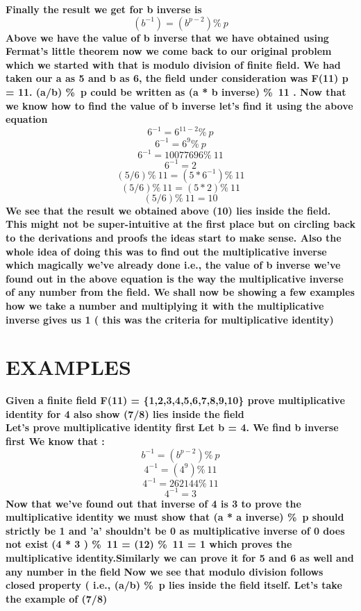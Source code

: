\documentclass{article}
\begin{document}
\textbf {Finally the result we get for b inverse is }
\textbf {\[ (b^{-1}) = (b ^{p-2})\%\ p \] }
\textbf {Above we have the value of b inverse that we have obtained using Fermat's little theorem now we come back to our original problem which we started with that is modulo division of finite field. We had taken our a as 5 and b as 6, the field under consideration was F(11) p = 11. (a/b) \%\ p could be written as (a * b inverse) \%\ 11 . Now that we know how to find the value of b inverse let's find it using the above equation}
\textbf {\[ 6 ^{-1}  = 6 ^{11 -2} \%\ p \]}
\textbf{\[6 ^{-1} = 6 ^{9} \%\ p \]}
\textbf {\[6 ^{-1} = 10077696 \%\ 11 \]}
\textbf {\[6 ^{-1} = 2\]} 
\textbf {\[ (5/6) \%\ 11 = (5 * 6 ^{-1} ) \%\ 11 \]}
\textbf {\[ (5/6) \%\ 11 = (5 * 2 ) \%\ 11 \]}
\textbf {\[ (5/6) \%\ 11 = 10 \]}
\textbf { We see that the result we obtained above (10) lies inside the field. This might not be super-intuitive at the first place but on circling back to the derivations and proofs the ideas start to make sense. Also the whole idea of doing this was to find out the multiplicative inverse which magically we've already done i.e., the value of b inverse we've found out in the above equation is the way the multiplicative inverse of any number from the field. We shall now be showing a few examples how we take  a number and multiplying it with the multiplicative inverse gives us 1 ( this was the criteria for multiplicative identity) }

\pagebreak 
\section * {EXAMPLES}
\textbf {Given a finite field F(11) = \{1,2,3,4,5,6,7,8,9,10\} prove multiplicative identity for 4 also show  (7/8) lies inside the field}
\\
\textbf {Let's prove multiplicative identity first}
\textbf {Let b = 4. We find b inverse first We know that :}
\textbf{\[b ^{-1} = (b ^{p-2})\%\ p \]}
\textbf{\[4 ^{-1} = (4 ^{9}) \%\ 11 \]}
\textbf{\[4^{-1} = 262144 \%\ 11 \]}
\textbf{ \[4^{-1} = 3 \]}
\textbf{ Now that we've found out that inverse of 4 is 3 to prove the multiplicative identity we must show that (a * a inverse) \%\ p  should strictly be 1 and 'a' shouldn't be 0 as multiplicative inverse of 0 does not exist}
\textbf{(4 * 3 ) \%\ 11 = (12) \%\ 11 = 1  which proves the multiplicative identity.Similarly we can prove it for 5 and 6 as well and any number in the field}
\textbf{ Now we see that modulo division follows closed property ( i.e., (a/b) \%\ p lies inside the field itself. Let's take the example of (7/8) }
\end{document}
